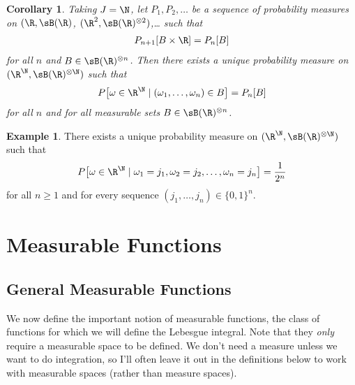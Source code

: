 \documentclass[12pt]{article}
\theoremstyle{plain}
\newtheorem{cor}[thm]{Corollary}
\theoremstyle{definition}
\newtheorem{ex}[thm]{Example}
\theoremstyle{remark}
\begin{document}
\begin{cor}
Taking $J=\N$, let $P_1,P_2,\ldots$ be a sequence of probability
measures on
$(\R,\sB(\R)$,
$(\R^2,\sB(\R)^{\otimes 2})$,\ldots
such that
\begin{align*}
  P_{n+1}[B\times \R] = P_n[B]
\end{align*}
for all $n$ and $B\in\sB(\R)^{\otimes n}$. Then there exists a unique
probability measure on $(\R^{\N},\sB(\R)^{\otimes \N})$ such that
\begin{align*}
  P\big[
    \omega\in \R^{\N} \; |\; (\omega_{1},\ldots,\omega_{n})
    \in B
  \big]
  = P_n[B]
\end{align*}
for all $n$ and for all measurable sets $B\in\sB(\R)^{\otimes n}$.
\end{cor}

\begin{ex}
There exists a unique probability measure on
$(\R^{\N},\sB(\R)^{\otimes \N})$ such that
\begin{align*}
  P\big[
    \omega\in \R^{\N} \; |\;
    \omega_1 = j_1, \omega_2=j_2,\ldots,\omega_n=j_n
  \big]
  = \frac{1}{2^n}
\end{align*}
for all $n\geq 1$ and for every sequence $(j_1,\ldots,j_n)\in\{0,1\}^n$.
\end{ex}


\clearpage
\section{Measurable Functions}

\subsection{General Measurable Functions}

We now define the important notion of measurable functions, the class of
functions for which we will define the Lebesgue integral. Note that they
\emph{only} require a measurable space to be defined. We don't need a
measure unless we want to do integration, so I'll often leave it out in
the definitions below to work with measurable spaces (rather than
measure spaces).
\end{document}
